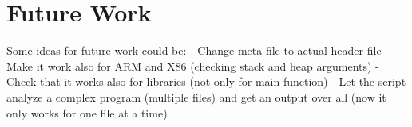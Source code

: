 \chapter{Future Work}

Some ideas for future work could be:
- Change meta file to actual header file
- Make it work also for ARM and X86 (checking stack and heap arguments)
- Check that it works also for libraries (not only for main function)
- Let the script analyze a complex program (multiple files) and get an output over all (now it only works for one file at a time)
